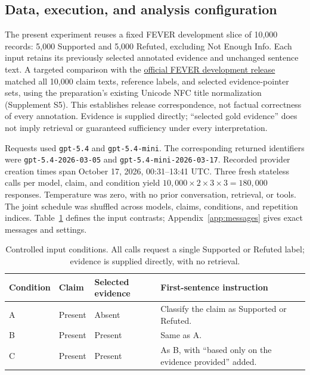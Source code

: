 \documentclass[11pt,letterpaper]{article}
\begin{document}
\subsection{Data, execution, and analysis configuration}\label{sec:setup}
The present experiment reuses a fixed FEVER development slice of 10,000 records: 5,000 Supported and 5,000 Refuted, excluding Not Enough Info. Each input retains its previously selected annotated evidence and unchanged sentence text. A targeted comparison with the \href{https://fever.ai/download/fever/shared_task_dev.jsonl}{official FEVER development release} matched all 10,000 claim texts, reference labels, and selected evidence-pointer sets, using the preparation's existing Unicode NFC title normalization (Supplement S5). This establishes release correspondence, not factual correctness of every annotation. Evidence is supplied directly; ``selected gold evidence'' does not imply retrieval or guaranteed sufficiency under every interpretation.

Requests used \texttt{gpt-5.4} and \texttt{gpt-5.4-mini}. The corresponding returned identifiers were \texttt{gpt-\allowbreak{}5.4-\allowbreak{}2026-\allowbreak{}03-\allowbreak{}05} and \texttt{gpt-\allowbreak{}5.4-\allowbreak{}mini-\allowbreak{}2026-\allowbreak{}03-\allowbreak{}17}. Recorded provider creation times span October 17, 2026, 00:31--13:41 UTC. Three fresh stateless calls per model, claim, and condition yield $10{,}000\times2\times3\times3=180{,}000$ responses. Temperature was zero, with no prior conversation, retrieval, or tools. The joint schedule was shuffled across models, claims, conditions, and repetition indices. Table~\ref{tab:conditions} defines the input contrasts; Appendix~\ref{app:messages} gives exact messages and settings.

\begin{table}[htbp]\centering\small
\caption{Controlled input conditions. All calls request a single Supported or Refuted label; evidence is supplied directly, with no retrieval.}\label{tab:conditions}
\begin{tabularx}{\linewidth}{lllX}\toprule
Condition & Claim & Selected evidence & First-sentence instruction \\\midrule
A & Present & Absent & Classify the claim as Supported or Refuted. \\
B & Present & Present & Same as A. \\
C & Present & Present & As B, with ``based only on the evidence provided'' added. \\
\bottomrule
\end{tabularx}
\end{table}
\end{document}
